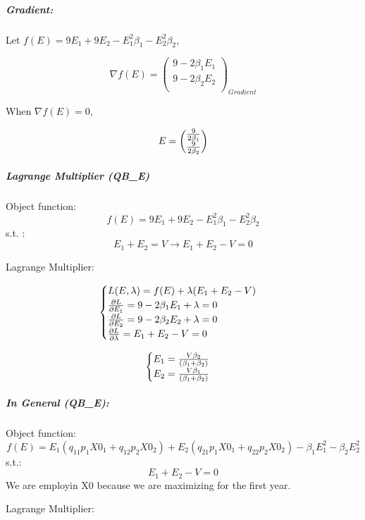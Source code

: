 \documentclass[
]{article}
\begin{document}
\hypertarget{gradient-1}{%
\subparagraph{\texorpdfstring{\textbf{Gradient:}}{Gradient:}}\label{gradient-1}}

Let \(f(E) = 9E_1+9E_2-E_1^2{\beta_1} - E_2^2{\beta_2}\),

\[\nabla f(E) = 
\begin{pmatrix}
9-2\beta_1E_1\\
9-2\beta_2E_2\\
\end{pmatrix}_{Gradient}
\]

When \(\nabla f(E) = 0\),

\[
E=\begin{pmatrix}
9\over 2\beta_1\\
9\over 2\beta_2\\
\end{pmatrix}
\]

\hypertarget{lagrange-multiplier-qb_e}{%
\subparagraph{\texorpdfstring{\textbf{Lagrange Multiplier
(QB\_E)}}{Lagrange Multiplier (QB\_E)}}\label{lagrange-multiplier-qb_e}}

Object function: \[
f(E) = 9E_1+9E_2-E_1^2{\beta_1} - E_2^2{\beta_2}
\] s.t. : \[
E_1 + E_2 = V \longrightarrow E_1 + E_2 - V = 0
\]

Lagrange Multiplier:

\[\begin{cases}
L(E, \lambda) = f(E) + \lambda(E_1 + E_2 - V)\\
{\partial L \over \partial E_1} = 9-2\beta_1E_1+\lambda=0\\
{\partial L \over \partial E_2} = 9-2\beta_2E_2+\lambda=0\\
{\partial L \over \partial \lambda} = E_1+E_2-V=0\\
\end{cases}
\]

\[\begin{cases}
E_1 = {V\beta_2\over (\beta_1 + \beta_2)}\\
E_2 = {V\beta_1\over (\beta_1 + \beta_2)}
\end{cases}
\]

\hypertarget{in-general-qb_e}{%
\subparagraph{\texorpdfstring{\textbf{In General
(QB\_E):}}{In General (QB\_E):}}\label{in-general-qb_e}}

Object function: \[
f(E) = E_1(q_{11}p_1X0_1+q_{12}p_2X0_2) + E_2(q_{21}p_1X0_1+q_{22}p_2X0_2) - \beta_1E_1^2 - \beta_2E_2^2
\] s.t.: \[
E_1 + E_2 -V = 0
\] We are employin X0 because we are maximizing for the first year.

Lagrange Multiplier:
\end{document}

